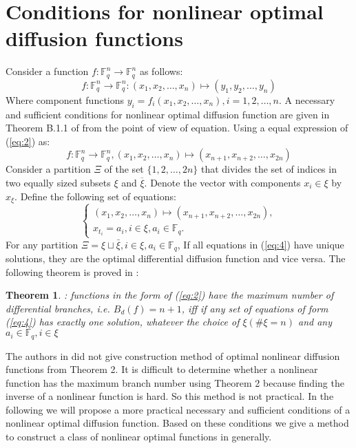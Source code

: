 \documentclass[12pt,a4paper]{article}
\newcommand{\0}{\textbf{0}}
\newcommand{\1}{\textbf{1}}
\newtheorem{theorem}{Theorem}
\begin{document}
\section{Conditions for nonlinear optimal diffusion functions}
    Consider a function $f: \mathbb{F}_{{q}}^{n} \rightarrow \mathbb{F}_{{q}}^{n}$ as follows:
    \begin{equation}\label{eq:2}
        f: \mathbb{F}_{{q}}^{n} \rightarrow \mathbb{F}_{{q}}^{n}:\left(x_{1}, x_{2}, \dots, x_{n}\right) \mapsto\left(y_{1}, y_{2}, \dots, y_{n}\right)
    \end{equation}
    Where component functions $y_{i}=f_{i}\left(x_{1}, x_{2}, \dots, x_{n}\right), i=1,2, \dots, n.$
    A necessary and sufficient conditions for nonlinear optimal diffusion function are given in Theorem B.1.1 of \cite{dawu2003advanced} from the point of view of equation. Using a equal expression of
    (\ref{eq:2}) as:
    \begin{equation}\label{eq:3}
        f: \mathbb{F}_{{q}}^{n} \rightarrow \mathbb{F}_{{q}}^{n},\left(x_{1}, x_{2}, \dots, x_{n}\right) \mapsto\left(x_{n+1}, x_{n+2}, \dots, x_{2 n}\right)
    \end{equation}
    Consider a partition $\Xi$ of the set $\{1,2, \dots, 2 n\}$ that divides the set of indices in two equally sized subsets $\xi$ and $\overline{\xi}$. Denote the vector with components $x_{i} \in \xi$ by $x_{\xi}$. Define the following set of equations:
    \begin{equation}\label{eq:4}
        \left\{\begin{array}{c}
            \left(x_{1}, x_{2}, \dots, x_{n}\right) \mapsto\left(x_{n+1}, x_{n+2}, \dots, x_{2 n}\right), \\
            x_{t_{i}}=a_{i}, i \in \xi, a_{i} \in \mathbb{F}_{q} .
        \end{array}\right.
    \end{equation}
    For any partition $\Xi=\xi \sqcup \bar{\xi}, i \in \xi, a_{i} \in \mathbb{F}_{q}$, If all equations in (\ref{eq:4}) have unique solutions, they are the optimal differential diffusion function and vice versa. The following theorem is proved in \cite{dawu2003advanced}:
    \begin{theorem}
        \cite{dawu2003advanced}: functions in the form of (\ref{eq:2}) have the maximum number of differential branches, 
        i.e. $B_{d}(f)=n+1$, iff if any set of equations of form (\ref{eq:4}) has exactly one solution, 
        whatever the choice of $\xi(\# \xi=n)$ and any $a_{i} \in \mathbb{F}_{q}, i \in \xi$
    \end{theorem}
    The authors in \cite{dawu2003advanced} did not give construction method of optimal nonlinear diffusion functions from Theorem 2.
    It is difficult to determine whether a nonlinear function has the maximum branch number using Theorem 2 because finding the inverse of a nonlinear function is hard. 
    So this method is not practical. 
    In the following we will propose a more practical necessary and sufficient conditions of a nonlinear optimal diffusion function. 
    Based on these conditions we give a method to construct a class of nonlinear optimal functions in generally.
\end{document}
